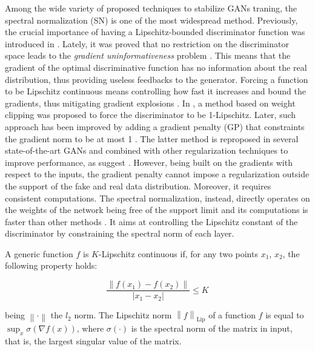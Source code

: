\documentclass[graybox]{svmult}
\begin{document}
\noindent Among the wide variety of proposed techniques to stabilize GANs traning, the spectral normalization (SN) \cite{Miyato2018SpectralNF} is one of the most widespread method. Previously, the crucial importance of having a Lipschitz-bounded discriminator function was introduced in \cite{Arjovsky2017WassersteinG, GulrajaniNIPS2017}. Lately, it was proved that no restriction on the discriminator space leads to the \textit{gradient uninformativeness} problem \cite{ZhouLipGan2019}. This means that the gradient of the optimal discriminative function has no information about the real distribution, thus providing useless feedbacks to the generator. Forcing a function to be Lipschitz continuous means controlling how fast it increases and bound the gradients, thus mitigating gradient explosions \cite{ZhouLipGan2019, GoukLipNN2021}. In \cite{Arjovsky2017WassersteinG}, a method based on weight clipping was proposed to force the discriminator to be 1-Lipschitz. Later, such approach has been improved by adding a gradient penalty (GP) that constraints the gradient norm to be at most 1 \cite{GulrajaniNIPS2017}. The latter method is reproposed in several state-of-the-art GANs and combined with other regularization techniques to improve performance, as suggest \cite{Kurach2019ALS}. However, being built on the gradients with respect to the inputs, the gradient penalty cannot impose a regularization outside the support of the fake and real data distribution. Moreover, it requires consistent computations. The spectral normalization, instead, directly operates on the weights of the network being free of the support limit and its computations is faster than other methods \cite{Miyato2018SpectralNF}. It aims at controlling the Lipschitz constant of the discriminator by constraining the spectral norm of each layer.

A generic function $f$ is $K$-Lipschitz continuous if, for any two points $x_1$, $x_2$, the following property holds:

\begin{equation}
    \frac{\left\| f\left(x_1\right) - f\left(x_2\right)\right\|}{\left| x_1 - x_2 \right|} \le K
\end{equation}

\noindent being $\left\| \cdot \right\|$ the $l_2$ norm.
The Lipschitz norm $\left\|f\right\|_{\text{Lip}}$ of a function $f$ is equal to $\sup_x \sigma(\nabla f(x))$, where $\sigma(\cdot)$ is the spectral norm of the matrix in input, that is, the largest singular value of the matrix.
\end{document}
